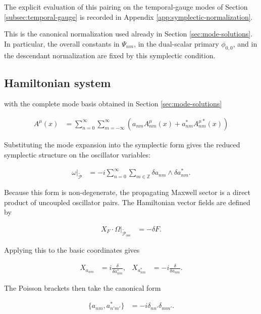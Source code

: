 The explicit evaluation of this pairing on the temporal-gauge modes of Section \ref{subsec:temporal-gauge} is recorded in Appendix \ref{app:symplectic-normalization}.

This is the canonical normalization used already in Section \ref{sec:mode-solutions}. In particular, the overall constants in $\Psi_{nm}$, in the dual-scalar primary $\phi_{0,0}$, and in the descendant normalization are fixed by this symplectic condition.

\subsection{Hamiltonian system}\label{subsec:hamiltonian-system-discrete}

with the complete mode basis obtained in Section \ref{sec:mode-solutions}

\begin{align}
A^{\mu}(x) & =\sum ^{\infty}_{n=0}\sum ^{\infty}_{m=-\infty}\left(a_{nm}A^{\mu}_{nm}(x)+a^{*}_{nm}A^{\mu *}_{nm}(x)\right)
\end{align}

Substituting the mode expansion into the symplectic form gives the reduced symplectic structure on the oscillator variables:

\begin{align}
\omega\big|_{\widetilde{\mathcal{P}}}&=-i\sum_{n=0}^{\infty}\sum_{m\in\mathbb{Z}}\delta a_{nm}\wedge\delta a_{nm}^{*}.
\end{align}

Because this form is non-degenerate, the propagating Maxwell sector is a direct product of uncoupled oscillator pairs. The Hamiltonian vector fields are defined by

\begin{align}
X_{F}\cdot\Omega\big|_{\widetilde{\mathcal{P}}_{\mathrm{osc}}}&=-\delta F.
\end{align}

Applying this to the basic coordinates gives

\begin{align}
X_{a_{nm}}&=i\frac{\delta}{\delta a_{nm}^{*}}, &
X_{a_{nm}^{*}}&=-i\frac{\delta}{\delta a_{nm}}.
\end{align}

The Poisson brackets then take the canonical form

\begin{align}
\{a_{nm},a_{n'm'}^{*}\}&=-i\delta_{nn'}\delta_{mm'}.
\end{align}

